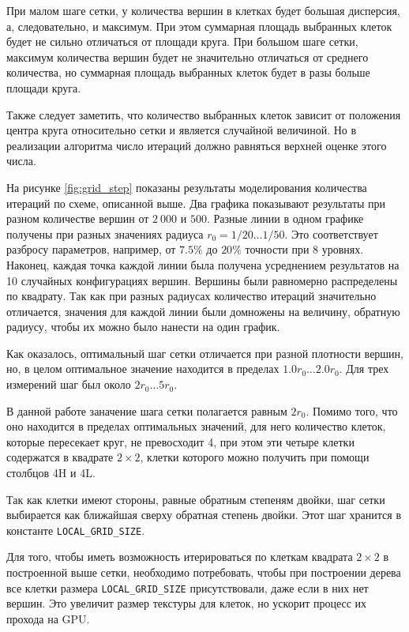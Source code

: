При малом шаге сетки, у количества вершин в клетках будет большая дисперсия, а, следовательно, и максимум. При этом суммарная площадь выбранных клеток будет не сильно отличаться от площади круга. При большом шаге сетки, максимум количества вершин будет не значительно отличаться от среднего количества, но суммарная площадь выбранных клеток будет в разы больше площади круга.

Также следует заметить, что количество выбранных клеток зависит от положения центра круга относительно сетки и является случайной величиной. Но в реализации алгоритма число итераций должно равняться верхней оценке этого числа.

На рисунке \ref{fig:grid_step} показаны результаты моделирования количества итераций по схеме, описанной выше. Два графика показывают результаты при разном количестве вершин от $2\ 000$ и $500$. Разные линии в одном графике получены при разных значениях радиуса $r_0 = 1 / 20 \ldots 1 / 50$. Это соответствует разбросу параметров, например, от $7.5\%$ до $20\%$ точности при 8 уровнях. Наконец, каждая точка каждой линии была получена усреднением результатов на 10 случайных конфигурациях вершин. Вершины были равномерно распределены по квадрату. Так как при разных радиусах количество итераций значительно отличается, значения для каждой линии были домножены на величину, обратную радиусу, чтобы их можно было нанести на один график.

Как оказалось, оптимальный шаг сетки отличается при разной плотности вершин, но, в целом оптимальное значение находится в пределах $1.0 r_0 \ldots 2.0 r_0$. Для трех измерений шаг был около $2r_0\ldots 5r_0$.

В данной работе заначение шага сетки полагается равным $2r_0$. Помимо того, что оно находится в пределах оптимальных значений, для него количество клеток, которые пересекает круг, не превосходит 4, при этом эти четыре клетки содержатся в квадрате $2\times 2$, клетки которого можно получить при помощи столбцов 4H и 4L.

Так как клетки имеют стороны, равные обратным степеням двойки, шаг сетки выбирается как ближайшая сверху обратная степень двойки. Этот шаг хранится в константе \texttt{LOCAL\_GRID\_SIZE}.

Для того, чтобы иметь возможность итерироваться по клеткам квадрата $2\times 2$ в построенной выше сетки, необходимо потребовать, чтобы при построении дерева все клетки размера \texttt{LOCAL\_GRID\_SIZE} присутствовали, даже если в них нет вершин. Это увеличит размер текстуры для клеток, но ускорит процесс их прохода на GPU.

